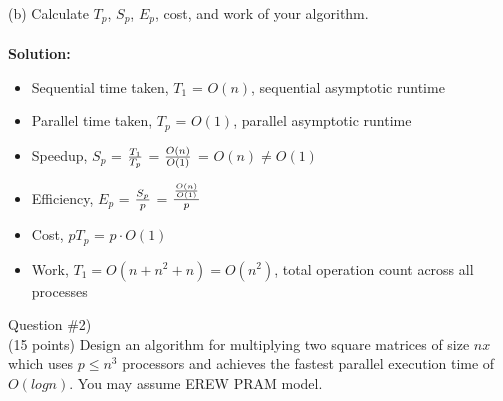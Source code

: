\documentclass{article}
\begin{document}
\noindent(b) Calculate $T_{p}$, $S_{p}$, $E_{p}$, cost, and work of your algorithm. \\~\\
\textbf{Solution: }
\begin{itemize}
    \item Sequential time taken, $T_{1}$ = $O(n)$, sequential asymptotic runtime
    \item Parallel time taken, $T_{p}$ = $O(1)$, parallel asymptotic runtime
    \item Speedup, $S_{p}$ = ${T_{1} \over T_{p}}$ = $O(n) \over O(1)$ = $O(n) \neq O(1)$
    \item Efficiency, $E_{p}$ = $S_{p} \over p$ = ${O(n) \over O(1)} \over p$
    \item Cost, $p T_{p}$ = $p \cdot O(1)$
    \item Work, $T_{1} = O(n + n^{2} + n) = O(n^{2})$, total operation count across all processes
\end{itemize}

\break

\noindent Question \#2)\\
(15 points) Design an algorithm for multiplying two square matrices of size $n x $ which uses 
$p \leq n^{3}$ processors and achieves the fastest parallel execution time of $O(log n)$. You may 
assume EREW PRAM model.\\~\\
\end{document}
